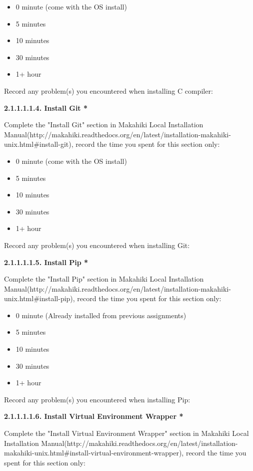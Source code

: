 \begin{itemize}
\item 0 minute (come with the OS install)
\item 5 minutes
\item  10 minutes
\item  30 minutes
\item  1+ hour
\end{itemize}

Record any problem(s) you encountered when installing C compiler:

{\bf 2.1.1.1.1.4. Install Git *}

Complete the "Install Git" section in Makahiki Local Installation Manual(http://makahiki.readthedocs.org/en/latest/installation-makahiki-unix.html\#install-git), record the time you spent for this section only:

\begin{itemize}
\item 0 minute (come with the OS install)
\item 5 minutes
\item  10 minutes
\item  30 minutes
\item  1+ hour
\end{itemize}

Record any problem(s) you encountered when installing Git:

{\bf 2.1.1.1.1.5. Install Pip *}

Complete the "Install Pip" section in Makahiki Local Installation Manual(http://makahiki.readthedocs.org/en/latest/installation-makahiki-unix.html\#install-pip), record the time you spent for this section only:

\begin{itemize}
\item 0 minute (Already installed from previous assignments)
\item 5 minutes
\item  10 minutes
\item  30 minutes
\item  1+ hour
\end{itemize}

Record any problem(s) you encountered when installing Pip:

{\bf 2.1.1.1.1.6. Install Virtual Environment Wrapper *}

Complete the "Install Virtual Environment Wrapper" section in Makahiki Local Installation Manual(http://makahiki.readthedocs.org/en/latest/installation-makahiki-unix.html\#install-virtual-environment-wrapper), record the time you spent for this section only:

